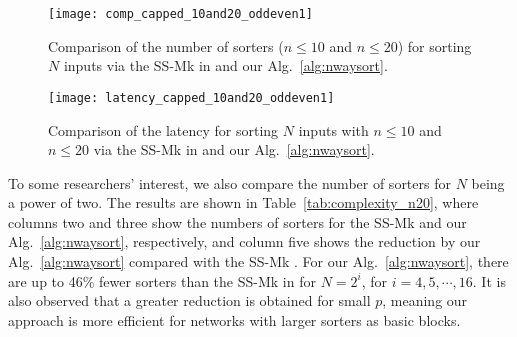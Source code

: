 \documentclass[10pt,journal,cspaper,compsoc]{IEEEtran}
\begin{document}
\begin{figure}[!h]
\centering
\texttt{[image: comp\_capped\_10and20\_oddeven1]}
\caption{Comparison of the number of sorters ($n\le 10$ and $n\le 20$) for sorting $N$ inputs via the SS-Mk in \cite{gao1997sloping} and our Alg.~\ref{alg:nwaysort}.}
\label{fig:complexity_n1020}
\end{figure}

\begin{figure}[!h]
\centering
\texttt{[image: latency\_capped\_10and20\_oddeven1]}
\caption{Comparison of the latency for sorting $N$ inputs with $n\le 10$ and $n\le 20$ via the SS-Mk in \cite{gao1997sloping} and our Alg.~\ref{alg:nwaysort}.}
\label{fig:latency_n1020}
\end{figure}


To some researchers' interest, we also compare the number of sorters for $N$ being a power of two. The results are shown in Table~\ref{tab:complexity_n20}, where columns two and three show the numbers of sorters for the SS-Mk and our Alg.~\ref{alg:nwaysort}, respectively, and column five shows the reduction by our Alg.~\ref{alg:nwaysort} compared with the SS-Mk \cite{gao1997sloping}. For our Alg.~\ref{alg:nwaysort}, there are up to 46\% fewer sorters than the SS-Mk in \cite{gao1997sloping} for $N = 2^i$, for $i=4,5,\cdots,16$.
It is also observed that a greater reduction is obtained for small $p$, meaning our approach is more efficient for networks with larger sorters as basic blocks.
\end{document}
